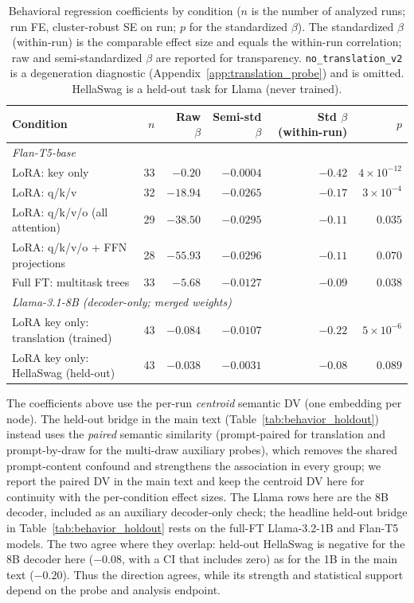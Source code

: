 \documentclass{article}
\theoremstyle{definition}
\theoremstyle{plain}
\begin{document}
\begin{table}[h]
\caption{Behavioral regression coefficients by condition ($n$ is the number of analyzed runs; run FE,
  cluster-robust SE on run; $p$ for
  the standardized $\beta$). The standardized $\beta$ (within-run) is the comparable effect size and
  equals the within-run correlation; raw and semi-standardized $\beta$ are reported for transparency.
  \texttt{no\_translation\_v2} is a degeneration diagnostic (Appendix~\ref{app:translation_probe}) and is
  omitted. HellaSwag is a held-out task for Llama (never trained).}
\label{tab:regression_betas}
\begin{center}
\small
\setlength{\tabcolsep}{3pt}
\begin{tabular}{lrrrrr}
\toprule
Condition & $n$ & Raw $\beta$ & Semi-std $\beta$ & Std $\beta$ (within-run) & $p$ \\
\midrule
\multicolumn{6}{l}{\textit{Flan-T5-base}} \\
LoRA: key only                   & 33 & $-0.20$  & $-0.0004$ & $-0.42$ & $4\!\times\!10^{-12}$ \\
LoRA: q/k/v                      & 32 & $-18.94$ & $-0.0265$ & $-0.17$ & $3\!\times\!10^{-4}$ \\
LoRA: q/k/v/o (all attention)   & 29 & $-38.50$ & $-0.0295$ & $-0.11$ & $0.035$ \\
LoRA: q/k/v/o + FFN projections & 28 & $-55.93$ & $-0.0296$ & $-0.11$ & $0.070$ \\
Full FT: multitask trees         & 33 & $-5.68$ & $-0.0127$ & $-0.09$ & $0.038$ \\
\midrule
\multicolumn{6}{l}{\textit{Llama-3.1-8B (decoder-only; merged weights)}} \\
LoRA key only: translation (trained) & 43 & $-0.084$ & $-0.0107$ & $-0.22$ & $5\!\times\!10^{-6}$ \\
LoRA key only: HellaSwag (held-out)  & 43 & $-0.038$ & $-0.0031$ & $-0.08$ & $0.089$ \\
\bottomrule
\end{tabular}
\end{center}
\end{table}

The coefficients above use the per-run \emph{centroid} semantic DV (one embedding per node). The
held-out bridge in the main text (Table~\ref{tab:behavior_holdout}) instead uses the \emph{paired}
semantic similarity (prompt-paired for translation and prompt-by-draw for the multi-draw auxiliary probes), which removes the shared prompt-content confound and strengthens the
association in every group; we report the paired DV in the main text and keep the centroid DV here for
continuity with the per-condition effect sizes. The Llama rows here are the 8B decoder, included as an
auxiliary decoder-only check; the headline held-out bridge in Table~\ref{tab:behavior_holdout} rests on the
full-FT Llama-3.2-1B and Flan-T5 models. The two agree where they overlap: held-out HellaSwag is
negative for the 8B decoder here ($-0.08$, with a CI that includes zero) as for the 1B in the main text
($-0.20$). Thus the direction agrees, while its strength and statistical support depend on the probe
and analysis endpoint.
\end{document}
